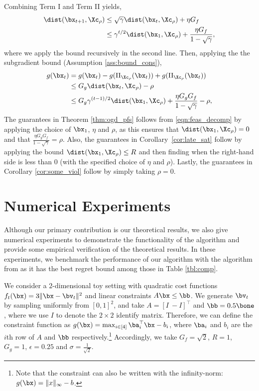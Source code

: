 Combining Term I and Term II yields,
\begin{align*}
    \dist(\bx_{t+1}, \Xc_\rho) & \leq \sqrt{\gamma} \dist(\bx_{t}, \Xc_\rho) + \eta G_f\\
    & \leq \gamma^{t/2} \dist(\bx_{1}, \Xc_\rho) + \frac{\eta G_f}{1 - \sqrt{\gamma}},     
\end{align*}
where we apply the bound recursively in the second line.
Then, applying the the subgradient bound (Assumption \ref{ass:bound_cons}),
\begin{equation}
    \label{eqn:feas_decomp}
    \begin{split}
        g(\bx_t) & = g(\bx_t) - g(\Pi_{\Xc_\rho} (\bx_t)) + g(\Pi_{\Xc_\rho} (\bx_t))\\
        & \leq G_g \dist(\bx_t, \Xc_\rho) - \rho \\
        & \leq G_g \gamma^{(t-1)/2} \dist(\bx_{1}, \Xc_\rho) + \frac{\eta G_g  G_f}{1 - \sqrt{\gamma}} - \rho,
    \end{split}
\end{equation}
The guarantees in Theorem \ref{thm:ogd_pfs} follows from \eqref{eqn:feas_decomp} by applying the choice of $\bx_1$, $\eta$ and $\rho$, as this ensures that $\dist(\bx_{1}, \Xc_\rho) = 0$ and that $\frac{\eta G_g  G_f}{1 - \sqrt{\gamma}} = \rho$.
Also, the guarantees in Corollary~\ref{cor:late_sat} follow by applying the bound $\dist(\bx_{1}, \Xc_\rho) \leq R$ and then finding when the right-hand side is less than $0$ (with the specified choice of $\eta$ and $\rho$).
Lastly, the guarantees in Corollary \ref{cor:some_viol} follow by simply taking $\rho = 0$.

\section{Numerical Experiments}
\label{sec:num_exp}


Although our primary contribution is our theoretical results, we also give numerical experiments to demonstrate the functionality of the algorithm and provide some empirical verification of the theoretical results.
In these experiments, we benchmark the performance of our algorithm with the algorithm from \citet{yu2017online} as it has the best regret bound among those in Table \ref{tbl:comp}.


We consider a $2$-dimensional toy setting with quadratic cost functions $f_t(\bx) = 3 \| \bx - \bv_t \|^2$ and linear constraints $A \bx \leq \bb$.
We generate $\bv_t$ by sampling uniformly from $[0,1]^2$, and take $A = [I\ -I]^\top$ and $\bb = 0.5 \bone$, where we use $I$ to denote the $2 \times 2$ identify matrix.
Therefore, we can define the constraint function as $g(\bx) = \max_{i \in [4]} \ba_i^\top \bx - b_i$, where $\ba_i$ and $b_i$ are the $i$th row of $A$ and $\bb$ respectively.\footnote{Note that the constraint can also be written with the infinity-norm: $g(\bx) = \| x \|_{\infty} - b$.}
Accordingly, we take $G_f = \sqrt{2}$, $R = 1$, $G_g = 1$, $\epsilon = 0.25$ and $\sigma = \frac{1}{\sqrt{2}}$.

